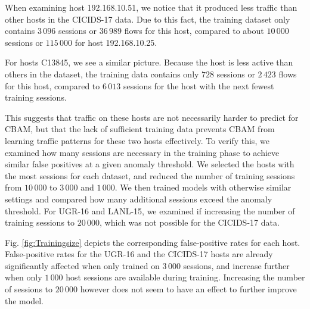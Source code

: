 When examining host 192.168.10.51, we notice that it produced less traffic than other hosts in the CICIDS-17 data. Due to this fact, the training dataset only contains $3\,096$ sessions or $36\,989$ flows for this host, compared to about $10\,000$ sessions or $115\,000$ for host 192.168.10.25. 


For hosts C13845, we see a similar picture. Because the host is less active than others in the dataset,
 the training data contains only $728$ sessions or $2\,423$ flows for this host, compared to $6\,013$ sessions for the host with the next fewest training sessions. 



This suggests that traffic on these hosts are not necessarily harder to predict for CBAM, but that the lack of sufficient training data prevents CBAM from learning traffic patterns for these two hosts effectively. To verify this, we examined how many sessions are necessary in the training phase to achieve similar false positives at a given anomaly threshold. 
We selected the hosts with the most sessions for each dataset, and reduced the number of training sessions from $10\,000$ to $3\,000$ and $1\,000$. We then trained models with otherwise similar settings and compared how many additional sessions exceed the anomaly threshold. For UGR-16 and LANL-15, we examined if increasing the number of training sessions to $20\,000$, which was not possible for the CICIDS-17 data.

Fig. \ref{fig:Trainingsize} depicts the corresponding false-positive rates for each host. False-positive rates for the UGR-16 and the CICIDS-17 hosts are already significantly affected when only trained on $3\,000$ sessions, and increase further when only $1\,000$ host sessions are available during training. Increasing the number of sessions to $20\,000$ however does not seem to have an effect to further improve the model.

